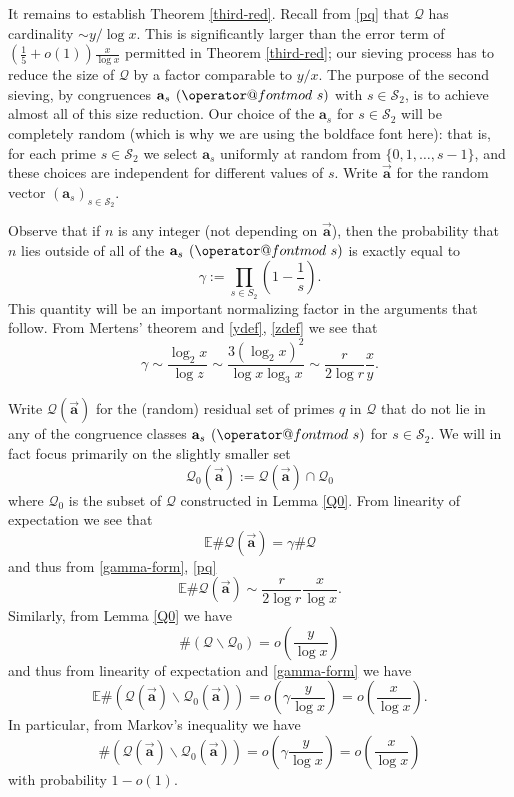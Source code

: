 \documentclass[11pt]{amsart}
\makeatletter
\numberwithin{equation}{section}  %
\theoremstyle{remark}
\theoremstyle{plain}
\numberwithin{equation}{section}
\newcommand{\E}{\mathbb{E}}  %
\renewcommand{\pmod}[1]{\allowbreak\mkern7mu({\operator@font mod}\,\,#1)}
\renewcommand{\(}{\left(}
\renewcommand{\)}{\right)}
\newcommand{\asym}{\sim}   %
\newcommand{\vect}[1]{{\ensuremath{\vec{#1}}}}
\newcommand{\QQ}{\mathcal{Q}}
\newcommand{\cS}{\mathcal{S}}
\makeatother
\begin{document}
It remains to establish Theorem \ref{third-red}.
Recall from \eqref{pq} that $\QQ$ has cardinality $\asym y/\log x$.  This is significantly larger than the error term of $(\frac{1}{5}+o(1)) \frac{x}{\log x}$ permitted in Theorem \ref{third-red}; our sieving process has to reduce the size of $\QQ$ by a factor comparable to $y/x$.  The purpose of the second sieving, by congruences $\mathbf{a}_s \pmod{s}$ with $s \in \cS_2$, is to achieve almost all of this size reduction. Our choice of the $\mathbf{a}_s$ for $s \in \cS_2$ will be completely random (which is why we are using the boldface font here): that is, for each prime $s \in \cS_2$ we select $\mathbf{a}_s$ uniformly at random from $\{0,1,\dots, s-1\}$, and these choices are independent for different values of $s$. Write $\vect{\mathbf{a}}$ for the random vector $(\mathbf{a}_s)_{s \in \cS_2}$.

Observe that if $n$ is any integer (not depending on $\vect{\mathbf{a}}$), then the probability that $n$ lies outside of all of the $\mathbf{a}_s \pmod{s}$ is exactly equal to
$$ \gamma := \prod_{s \in S_2} \left(1 - \frac{1}{s}\right).$$
This quantity will be an important normalizing factor in the arguments that follow.
From Mertens' theorem and \eqref{ydef}, \eqref{zdef} we see that
\begin{equation}\label{gamma-form}
\gamma \asym \frac{\log_2 x}{\log z} \asym \frac{3 (\log_2 x)^2}{\log x \log_3 x} \asym  \frac{r}{2\log r} \frac{x}{y}.
\end{equation}

Write $\QQ(\vect{\mathbf{a}})$ for the (random) residual set of primes $q$ in $\QQ$ that do not lie in any of the congruence classes $\mathbf{a}_s \pmod{s}$ for $s \in \cS_2$.  We will in fact focus primarily on the slightly smaller set
$$ \QQ_0(\vect{\mathbf{a}}) := \QQ(\vect{\mathbf{a}}) \cap \QQ_0$$
where $\QQ_0$ is the subset of $\QQ$ constructed in Lemma \ref{Q0}. 
From linearity of expectation we see that
\begin{equation}\label{eqa}
\E \# \QQ(\vect{\mathbf{a}}) = \gamma \# \QQ
\end{equation}
and thus from \eqref{gamma-form}, \eqref{pq}
\begin{equation}\label{qa}
 \E \# \QQ(\vect{\mathbf{a}}) \asym \frac{r}{2\log r} \frac{x}{\log x}.
\end{equation}
Similarly, from Lemma \ref{Q0} we have
$$ \# (\QQ \backslash \QQ_0) = o\left( \frac{y}{\log x} \right)$$
and thus from linearity of expectation and \eqref{gamma-form} we have
$$ \E \# (\QQ(\vect{\mathbf{a}}) \backslash \QQ_0(\vect{\mathbf{a}}) ) = o\left( \gamma \frac{y}{\log x} \right) = o\left( \frac{x}{\log x} \right).$$
In particular, from Markov's inequality we have
\begin{equation}\label{qq-qq0}
\# ( \QQ(\vect{\mathbf{a}}) \backslash \QQ_0(\vect{\mathbf{a}}) ) = o\left( \gamma \frac{y}{\log x} \right) = o\left( \frac{x}{\log x} \right)
\end{equation}
with probability $1-o(1)$.
\end{document}
